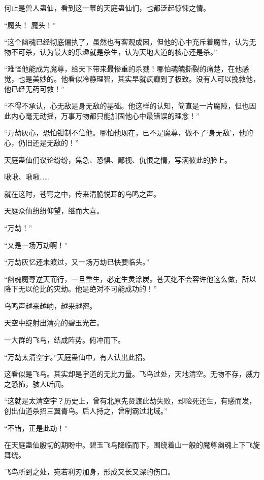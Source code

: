 
\begin{this_body}

何止是兽人蛊仙，看到这一幕的天庭蛊仙们，也都泛起惊悚之情。

“魔头！ 魔头！”

“这个幽魂已经彻底偏执了，虽然也有客观成因，但他的心中充斥着魔性，认为无物不可杀，认为最大的乐趣就是杀生，认为天地大道的核心还是杀。”

“难怪他能成为魔尊，给天下带来最惨重的杀戮！哪怕魂魄撕裂的痛楚，在他感觉，也是美妙的。他看似冷静理智，其实早就疯癫到了极致。没有人可以挽救他，他已经无药可救！”

“不得不承认，心无敌是身无敌的基础。他这样的认知，简直是一片魔障，但也因此内心毫无动摇，万事万物都只能加固他心中最错误的理念！”

“万劫灰心，恐怕钳制不住他。哪怕他现在，已不是魔尊，做不了‘身无敌’，他的心，仍旧还是无敌的！”

天庭蛊仙们议论纷纷，焦急、恐惧、鄙视、仇恨之情，写满彼此的脸上。

啾啾、啾啾……

就在这时，苍穹之中，传来清脆悦耳的鸟鸣之声。

天庭众仙纷纷仰望，继而大喜。

“万劫！”

“又是一场万劫啊！”

“万劫灰忆还未渡过，又一场万劫已快要临头。”

“幽魂魔尊逆天而行，一旦重生，必定生灵涂炭。苍天绝不会容许他这么做，所以降下无以伦比的灾劫。他是绝对不可能成功的！”

鸟鸣声越来越响，越来越密。

天空中绽射出清亮的碧玉光芒。

一大群的飞鸟，结成阵势。俯冲而下。

“万劫太清空宇。”天庭蛊仙中，有人认出此招。

这看似是飞鸟。其实却是宇道的无比力量。飞鸟过处，天地清空。无物不存，威力之恐怖，骇人听闻。

“这就是太清空宇？历史上，曾有北原先贤渡此劫失败，却险死还生，有感而发，创出仙道杀招三翼青鸟。后人持之，曾制霸过北域。”

“不错，正是此劫！”

在天庭蛊仙殷切的期盼中。碧玉飞鸟降临而下，围绕着山一般的魔尊幽魂上下飞旋舞绕。

飞鸟所到之处，宛若利刃加身，形成又长又深的伤口。


\end{this_body}
